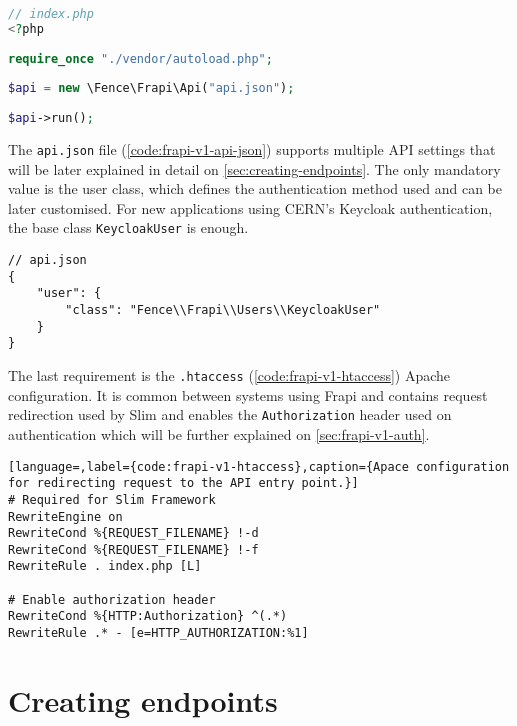 \begin{lstlisting}[language=PHP,label={code:frapi-v1-index-php},caption={Script executed when any REST API request arrives at the server.}]
// index.php
<?php
 
require_once "./vendor/autoload.php";
  
$api = new \Fence\Frapi\Api("api.json");
 
$api->run();
\end{lstlisting}

The \texttt{api.json} file (\autoref{code:frapi-v1-api-json}) supports multiple API settings that will be later explained in detail on \autoref{sec:creating-endpoints}. The only mandatory value is the user class, which defines the authentication method used and can be later customised. For new applications using CERN's Keycloak \cite{keycloak-website} authentication, the base class \texttt{KeycloakUser} is enough.

\begin{lstlisting}[language=JS,label={code:frapi-v1-api-json},caption={Minimal configuration for Frapi v1.}]
// api.json
{
    "user": {
        "class": "Fence\\Frapi\\Users\\KeycloakUser"
    }
}
\end{lstlisting}

The last requirement is the \texttt{.htaccess} (\autoref{code:frapi-v1-htaccess}) Apache configuration. It is common between systems using Frapi and contains request redirection used by Slim and enables the \texttt{Authorization} header used on authentication which will be further explained on \autoref{sec:frapi-v1-auth}.

\begin{lstlisting}[language=,label={code:frapi-v1-htaccess},caption={Apace configuration for redirecting request to the API entry point.}]
# Required for Slim Framework
RewriteEngine on
RewriteCond %{REQUEST_FILENAME} !-d
RewriteCond %{REQUEST_FILENAME} !-f
RewriteRule . index.php [L]
 
# Enable authorization header
RewriteCond %{HTTP:Authorization} ^(.*)
RewriteRule .* - [e=HTTP_AUTHORIZATION:%1]
\end{lstlisting}

\section{Creating endpoints}\label{sec:creating-endpoints}


